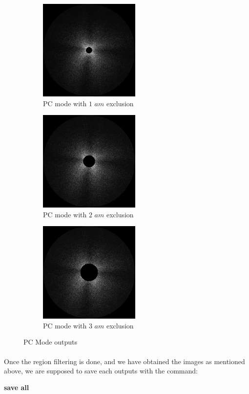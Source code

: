 \documentclass[a4paper,twoside]{report}
\numberwithin{equation}{section}
\begin{document}
\begin{figure}[h]
\begin{subfigure}{0.32\textwidth}
\includegraphics[width=1.0\linewidth, height=5cm]{PCP4_1am.jpeg} 
\caption{PC mode with $1$ $am$ exclusion}
\label{PC_1am}
\end{subfigure}
\begin{subfigure}{0.32\textwidth}
\includegraphics[width=1.0\linewidth, height=5cm]{PCP4_2am.jpeg}
\caption{PC mode with $2$ $am$ exclusion}
\label{PC_2am}
\end{subfigure}
\begin{subfigure}{0.32\textwidth}
\includegraphics[width=1.0\linewidth, height=5cm]{PCP4_3am.jpeg}
\caption{PC mode with $3$ $am$ exclusion}
\label{PC_3am}
\end{subfigure}
\caption{PC Mode outputs}
\label{PC_op}
\end{figure}
\paragraph{}
Once the region filtering is done, and we have obtained the images as mentioned above, we are supposed to save each outputs with the command:
\begin{center}
\item \large \textbf{save all}
\end{center}
\end{document}
